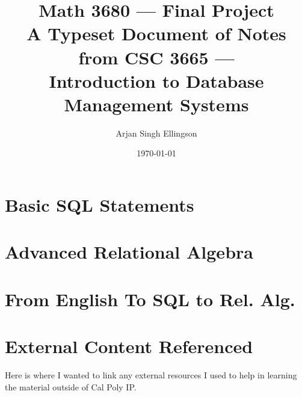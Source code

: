 \documentclass{article} %
\title{Math 3680 — Final Project \\
\large {A Typeset Document of Notes from CSC 3665 — \\
Introduction to Database Management Systems}}
\author{Arjan Singh Ellingson}
\date{\today}
\begin{document}
\newpage
\maketitle
\tableofcontents

\newpage



\section{Basic SQL Statements}
\section{Advanced Relational Algebra}
\section{From English To SQL to Rel. Alg.}
\section{External Content Referenced}
Here is where I wanted to link any external resources I used to help in learning the material outside of Cal Poly IP. 


\newpage
\printindex
\end{document}

